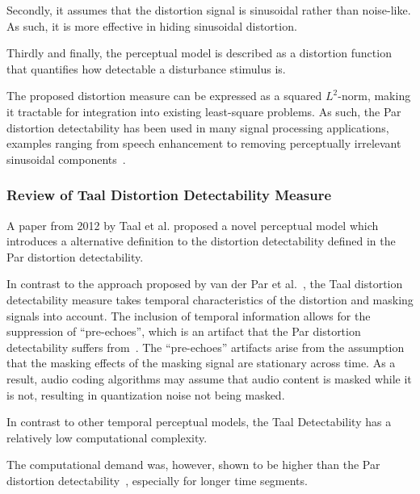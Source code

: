 Secondly, it assumes that the distortion signal is sinusoidal rather than noise-like.
As such, it is more effective in hiding sinusoidal distortion.

Thirdly and finally, the perceptual model is described as a distortion function that quantifies how detectable a disturbance stimulus is.

The proposed distortion measure can be expressed as a squared $L^2$-norm, making it tractable for integration into existing least-square problems.
As such, the Par distortion detectability has been used in many signal processing applications, examples ranging from speech enhancement to removing perceptually irrelevant sinusoidal 
components~\cite{balazs2009time, taal2013optimal}.

\subsubsection{Review of Taal Distortion Detectability Measure}
A paper from 2012 by Taal et al. proposed a novel perceptual model \cite{taal2012low} which introduces a
alternative definition to the distortion detectability defined in the Par distortion detectability.

In contrast to the approach proposed by van der Par et al.~\cite{van2005perceptual},
the Taal distortion detectability measure takes temporal characteristics of the distortion and masking signals into account.
The inclusion of temporal information allows for the suppression of ``pre-echoes'', which is an artifact that 
the Par distortion detectability suffers from~\cite{taal2012low}. 
The ``pre-echoes'' artifacts arise from the assumption that the masking effects of the masking signal are stationary across time. 
As a result, audio coding algorithms may assume that audio content is masked while it is not, resulting in quantization noise not being masked.

In contrast to other temporal perceptual models, the Taal Detectability has a relatively low computational complexity.

The computational demand was, however, shown to be higher than the Par distortion detectability~\cite{taal2012low}, 
especially for longer time segments.
